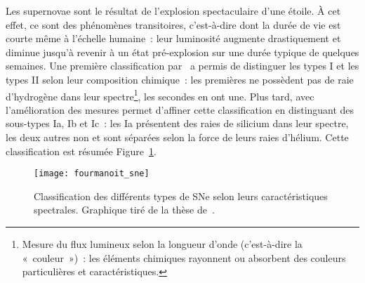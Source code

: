 \documentclass[../main/main.tex]{subfiles}
\begin{document}
Les supernovae sont le résultat de l'explosion spectaculaire d'une étoile. À cet
effet, ce sont des phénomènes transitoires, c'est-à-dire dont la durée de vie
est courte même à l'échelle humaine~: leur luminosité augmente drastiquement et
diminue jusqu'à revenir à un état pré-explosion sur une durée typique de
quelques semaines. Une première classification par~\cite{minkowski1941} a permis
de distinguer les types I et les types II selon leur composition chimique~: les
premières ne possèdent pas de raie d'hydrogène dans leur spectre\footnote{Mesure
du flux lumineux selon la longueur d'onde (c'est-à-dire la «~couleur~»)~: les
éléments chimiques rayonnent ou absorbent des couleurs particulières et
caractéristiques.}, les secondes en ont une. Plus tard, \cite{elias1985} avec
l'amélioration des mesures permet d'affiner cette classification en distinguant
des sous-types Ia, Ib et Ic~: les Ia présentent des raies de silicium dans leur
spectre, les deux autres non et sont séparées selon la force de leurs raies
d'hélium. Cette classification est résumée Figure~\ref{fig:sne_class}.

\begin{figure}[ht]
    \centering
    \texttt{[image: fourmanoit\_sne]}
    \caption[Classification des différents types de SNe selon leurs
    caractéristiques spectrales]{Classification des différents types de SNe selon
        leurs caractéristiques spectrales. Graphique tiré de la thèse
    de~\cite{fourmanoit2010}.}\label{fig:sne_class}
\end{figure}
\end{document}
